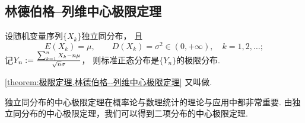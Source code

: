 \subsection{林德伯格--列维中心极限定理}
\begin{theorem}\label{theorem:极限定理.林德伯格--列维中心极限定理}
设随机变量序列\(\{X_k\}\)独立同分布，
且\begin{equation*}
	E(X_k)=\mu, \qquad
	D(X_k)=\sigma^2\in(0,+\infty),
	\quad k=1,2,\dotsc;
\end{equation*}
记\(
	Y_n
	:=
	\frac{\sum_{k=1}^n X_k - n\mu}{\sqrt{n} \sigma}
\)，
则标准正态分布是\(\{Y_n\}\)的极限分布.
\end{theorem}

\cref{theorem:极限定理.林德伯格--列维中心极限定理} 又叫做.

独立同分布的中心极限定理在概率论与数理统计的理论与应用中都非常重要.
由独立同分布的中心极限定理，我们可以得到二项分布的中心极限定理.

